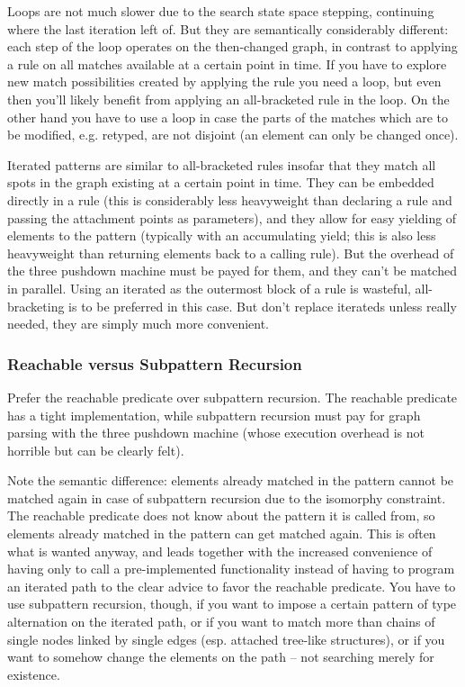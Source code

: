 Loops are not much slower due to the search state space stepping, continuing where the last iteration left of.
But they are semantically considerably different: each step of the loop operates on the then-changed graph, in contrast to applying a rule on all matches available at a certain point in time.
If you have to explore new match possibilities created by applying the rule you need a loop, but even then you'll likely benefit from applying an all-bracketed rule in the loop.
On the other hand you have to use a loop in case the parts of the matches which are to be modified, e.g. retyped, are not disjoint (an element can only be changed once).

Iterated patterns are similar to all-bracketed rules insofar that they match all spots in the graph existing at a certain point in time.
They can be embedded directly in a rule (this is considerably less heavyweight than declaring a rule and passing the attachment points as parameters), and they allow for easy yielding of elements to the pattern (typically with an accumulating yield; this is also less heavyweight than returning elements back to a calling rule).
But the overhead of the three pushdown machine must be payed for them, and they can't be matched in parallel.
Using an iterated as the outermost block of a rule is wasteful, all-bracketing is to be preferred in this case.
But don't replace iterateds unless really needed, they are simply much more convenient.

\subsubsection*{Reachable versus Subpattern Recursion}
Prefer the reachable predicate over subpattern recursion.
The reachable predicate has a tight implementation, while subpattern recursion must pay for graph parsing with the three pushdown machine (whose execution overhead is not horrible but can be clearly felt).

Note the semantic difference: elements already matched in the pattern cannot be matched again in case of subpattern recursion due to the isomorphy constraint. 
The reachable predicate does not know about the pattern it is called from, so elements already matched in the pattern can get matched again.
This is often what is wanted anyway, and leads together with the increased convenience of having only to call a pre-implemented functionality instead of having to program an iterated path to the clear advice to favor the reachable predicate.
You have to use subpattern recursion, though, if you want to impose a certain pattern of type alternation on the iterated path, 
or if you want to match more than chains of single nodes linked by single edges (esp. attached tree-like structures), 
or if you want to somehow change the elements on the path -- not searching merely for existence.

